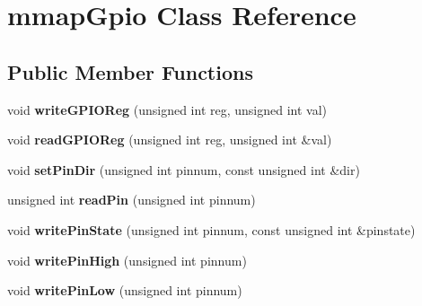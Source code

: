 \hypertarget{classmmap_gpio}{}\section{mmap\+Gpio Class Reference}
\label{classmmap_gpio}
\subsection*{Public Member Functions}
\begin{DoxyCompactItemize}
\item 
\mbox{\label{classmmap_gpio_a75ecfa55f82d4ee5634691870a47f520}} 
void {\bfseries write\+G\+P\+I\+O\+Reg} (unsigned int reg, unsigned int val)
\item 
\mbox{\label{classmmap_gpio_a6dfedfbb3795a838ef0365112fec0c22}} 
void {\bfseries read\+G\+P\+I\+O\+Reg} (unsigned int reg, unsigned int \&val)
\item 
\mbox{\label{classmmap_gpio_a07d84daf456da28959b860aae9ae79e3}} 
void {\bfseries set\+Pin\+Dir} (unsigned int pinnum, const unsigned int \&dir)
\item 
\mbox{\label{classmmap_gpio_a22a1a91117b317e858f54175c6d2ced0}} 
unsigned int {\bfseries read\+Pin} (unsigned int pinnum)
\item 
\mbox{\label{classmmap_gpio_a40ab33447a086b8507a304546d20d8b7}} 
void {\bfseries write\+Pin\+State} (unsigned int pinnum, const unsigned int \&pinstate)
\item 
\mbox{\label{classmmap_gpio_acf638bae600fcff2a4c7bbdede8fda69}} 
void {\bfseries write\+Pin\+High} (unsigned int pinnum)
\item 
\mbox{\label{classmmap_gpio_af656a4a550f0665c98816d284113a2ba}} 
void {\bfseries write\+Pin\+Low} (unsigned int pinnum)
\end{DoxyCompactItemize}
